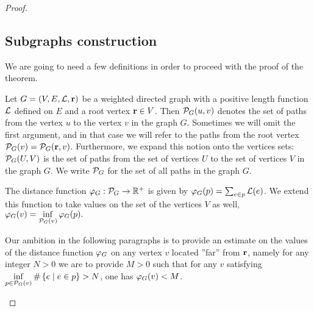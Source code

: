 \documentclass[12pt,oneside,a4paper]{amsart}
\begin{document}
\begin{proof}
      \subsection{Subgraphs construction}
        We are going to need a few definitions in order to proceed with the proof of the theorem.
        \begin{definition}
          Let $G = (V, E,\mathcal{L}, \mathbf{r})$ be a weighted directed graph with a positive
            length function $\mathcal{L}$ defined on $E$ and a root vertex $\mathbf{r} \in V$.
          Then $\mathcal{P}_{G}(u, v)$ denotes the set of paths from the vertex $u$ to the vertex $v$ in the graph $G$.
          Sometimes we will omit the first argument, and in that case we will refer to the paths from the root vertex
            $\mathcal{P}_{G}(v) = \mathcal{P}_{G}(\mathbf{r}, v)$.
          Furthermore, we expand this notion onto the vertices sets: $\mathcal{P}_{G}(U,V)$ is the set of paths
            from the set of vertices $U$ to the set of vertices $V$ in the graph $G$.
          We write $\mathcal{P}_{G}$ for the set of all paths in the graph $G$.
        \end{definition}
        \begin{definition}
          The distance function $\varphi_{G}: \mathcal{P}_{G} \to \mathbb{R}^{+}$ is given by $\varphi_{G}(p) = \sum_{e \in p} \mathcal{L}(e)$.
          We extend this function to take values on the set of the vertices $V$ as well,
            $\varphi_{G}(v) = \displaystyle\inf_{\mathcal{P}_{G}(v)} \varphi_{G}(p).$
        \end{definition}
        \begin{remark}
          Our ambition in the following paragraphs is to provide an estimate on the values of the distance function $\varphi_{G}$ on any vertex $v$
            located ''far'' from $\mathbf{r}$, namely for any integer $N > 0$ we are to provide $M > 0$ such that
            for any $v$ satisfying $\displaystyle\inf_{p \in \mathcal{P}_{G}(v)} \#\left\{ e \mid e \in p\right\} > N$, one has $\varphi_{G}(v) < M$.
        \end{remark}


\end{proof}
\end{document}
